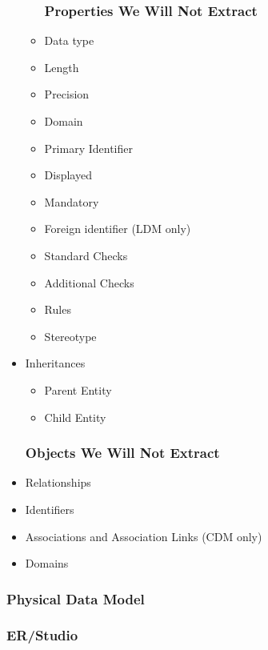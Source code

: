 \documentclass[12pt,a4paper]{report}
\begin{document}
\begin{itemize}
\begin{itemize}
		\subsubsection{Properties We Will Not Extract}
		\item Data type 
		\item Length 
		\item Precision
		\item Domain
		\item Primary Identifier
		\item Displayed
		\item Mandatory
		\item Foreign identifier (LDM only)
		\item Standard Checks
		\item Additional Checks
		\item Rules
		\item Stereotype
	\end{itemize}
	\item Inheritances
	\begin{itemize}
		\item Parent Entity
		\item Child Entity
	\end{itemize}
	\subsubsection{Objects We Will Not Extract}
	\item Relationships
	\item Identifiers
	\item Associations and Association Links (CDM only)
	\item Domains
\end{itemize}

\subsubsection{Physical Data Model}

\subsubsection{ER/Studio}
\end{document}
